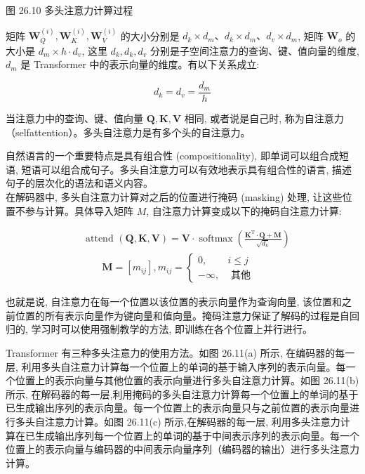 \documentclass[10pt]{article}
\begin{document}
图 26.10 多头注意力计算过程

矩阵 $\boldsymbol{W}_{Q}^{(i)}, \boldsymbol{W}_{K}^{(i)}, \boldsymbol{W}_{V}^{(i)}$ 的大小分别是 $d_{k} \times d_{m} 、 d_{k} \times d_{m} 、 d_{v} \times d_{m}$, 矩阵 $\boldsymbol{W}_{o}$ 的大小是 $d_{m} \times h \cdot d_{v}$, 这里 $d_{k}, d_{k}, d_{v}$ 分别是子空间注意力的查询、键、值向量的维度, $d_{m}$ 是 Transformer 中的表示向量的维度。有以下关系成立:

$$
d_{k}=d_{v}=\frac{d_{m}}{h}
$$

当注意力中的查询、键、值向量 $\boldsymbol{Q}, \boldsymbol{K}, \boldsymbol{V}$ 相同, 或者说是自己时, 称为自注意力（selfattention）。多头自注意力是有多个头的自注意力。

自然语言的一个重要特点是具有组合性 (compositionality), 即单词可以组合成短语, 短语可以组合成句子。多头自注意力可以有效地表示具有组合性的语言, 描述句子的层次化的语法和语义内容。\\
在解码器中, 多头自注意力计算对之后的位置进行掩码 (masking) 处理, 让这些位置不参与计算。具体导入矩阵 $M$, 自注意力计算变成以下的掩码自注意力计算:


\begin{align*}
& \text { attend }(\boldsymbol{Q}, \boldsymbol{K}, \boldsymbol{V})=\boldsymbol{V} \cdot \operatorname{softmax}\left(\frac{\boldsymbol{K}^{\mathrm{T}} \cdot \boldsymbol{Q}+\boldsymbol{M}}{\sqrt{d_{k}}}\right)  \tag{26.24}\\
& \qquad \boldsymbol{M}=\left[m_{i j}\right], m_{i j}= \begin{cases}0, & i \leqslant j \\
-\infty, & \text { 其他 }\end{cases} \tag{26.25}
\end{align*}


也就是说, 自注意力在每一个位置以该位置的表示向量作为查询向量, 该位置和之前位置的所有表示向量作为键向量和值向量。掩码注意力保证了解码的过程是自回归的, 学习时可以使用强制教学的方法, 即训练在各个位置上并行进行。

Transformer 有三种多头注意力的使用方法。如图 26.11(a) 所示, 在编码器的每一层, 利用多头自注意力计算每一个位置上的单词的基于输入序列的表示向量。每一个位置上的表示向量与其他位置的表示向量进行多头自注意力计算。如图 26.11(b) 所示, 在解码器的每一层,利用掩码的多头自注意力计算每一个位置上的单词的基于已生成输出序列的表示向量。每一个位置上的表示向量只与之前位置的表示向量进行多头自注意力计算。如图 26.11(c) 所示,在解码器的每一层, 利用多头注意力计算在已生成输出序列每一个位置上的单词的基于中间表示序列的表示向量。每一个位置上的表示向量与编码器的中间表示向量序列（编码器的输出）进行多头注意力计算。
\end{document}

